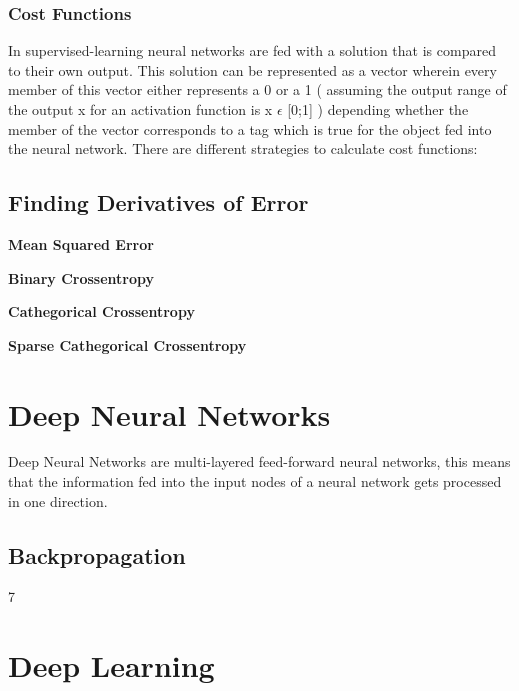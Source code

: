 \subsubsection{Cost Functions}
In supervised-learning neural networks are fed with a solution that is compared to their own output. This solution can be represented as a vector wherein every member of this vector either represents a 0 or a 1 ( assuming the output range of the output x for an activation function is x $\epsilon$ [0;1] ) depending whether the member of the vector corresponds to a tag which is true for the object fed into the neural network.
There are different strategies to calculate cost functions:
\begin{description}
\subsection{Finding Derivatives of Error}
\item[$\bullet$] \textbf{Mean Squared Error}
\item[$\bullet$] \textbf{Binary Crossentropy}
\item[$\bullet$] \textbf{Cathegorical Crossentropy}
\item[$\bullet$] \textbf{Sparse Cathegorical Crossentropy}
\end{description}
\section{Deep Neural Networks}
Deep Neural Networks are multi-layered feed-forward neural networks, this means that the information fed into the input nodes of a neural network gets processed in one direction.
\subsection{Backpropagation}7




\Blindtext[4][1]

\section{Deep Learning}
\Blindtext[4][1]
